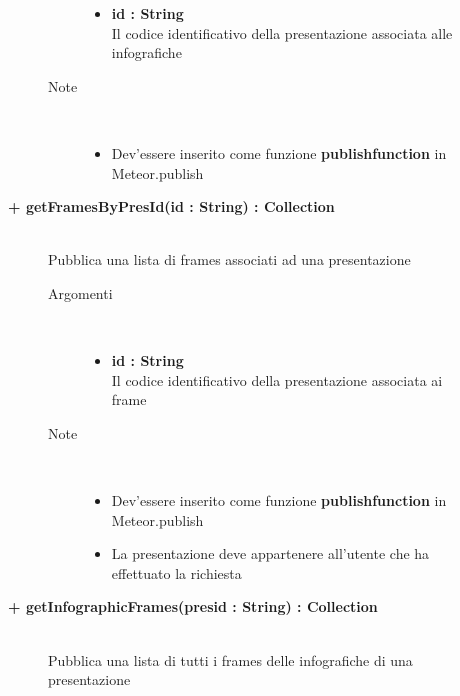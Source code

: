 \begin{description}
\begin{description}
\begin{description}
\begin{itemize}
					\item \textbf{id : String			} \hfill \\
					Il codice identificativo della presentazione associata alle infografiche
					
				\end{itemize}
			\item[Note] \hfill \\
			\begin{itemize}
					\item Dev'essere inserito come funzione \textbf{publishfunction} in Meteor.publish
				\end{itemize}
		\end{description}
	\end{description}
	
	\begin{description}
		\item[\textbf{\color{blue}+ getFramesByPresId(id : String) : Collection			}] \hfill \\
			Pubblica una lista di frames associati ad una presentazione
			
		\begin{description}
			\item[Argomenti] \hfill \\
				\begin{itemize}
				
					\item \textbf{id : String			} \hfill \\
					Il codice identificativo della presentazione associata ai frame
					
				\end{itemize}
			\item[Note] \hfill \\
			\begin{itemize}
					\item Dev'essere inserito come funzione \textbf{publishfunction} in Meteor.publish
					\item La presentazione deve appartenere all'utente che ha effettuato la richiesta
				\end{itemize}
		\end{description}
	\end{description}
	
	\begin{description}
		\item[\textbf{\color{blue}+ getInfographicFrames(presid : String) : Collection			}] \hfill \\
			Pubblica una lista di tutti i frames delle infografiche di una presentazione
			

\end{description}
\end{description}
